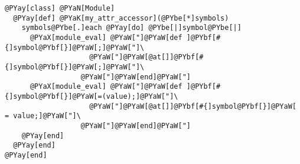 \begin{Verbatim}[commandchars=@\[\]]
@PYay[class] @PYaN[Module]
  @PYay[def] @PYaK[my_attr_accessor](@PYbe[*]symbols)
    symbols@PYbe[.]each @PYay[do] @PYbe[|]symbol@PYbe[|]
      @PYaX[module_eval] @PYaW["]@PYaW[def ]@PYbf[#{]symbol@PYbf[}]@PYaW[;]@PYaW["]\
                    @PYaW["]@PYaW[@at[]]@PYbf[#{]symbol@PYbf[}]@PYaW[;]@PYaW["]\
                  @PYaW["]@PYaW[end]@PYaW["]
      @PYaX[module_eval] @PYaW["]@PYaW[def ]@PYbf[#{]symbol@PYbf[}]@PYaW[=(value);]@PYaW["]\
                    @PYaW["]@PYaW[@at[]]@PYbf[#{]symbol@PYbf[}]@PYaW[ = value;]@PYaW["]\
                  @PYaW["]@PYaW[end]@PYaW["]
    @PYay[end]
  @PYay[end]
@PYay[end]
\end{Verbatim}
